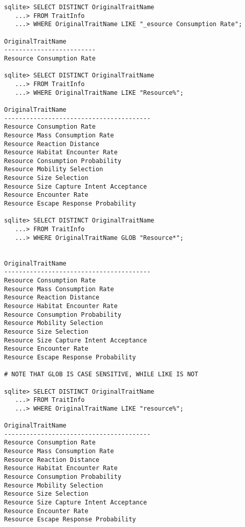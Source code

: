  \begin{lstlisting} 
sqlite> SELECT DISTINCT OriginalTraitName
   ...> FROM TraitInfo
   ...> WHERE OriginalTraitName LIKE "_esource Consumption Rate";

OriginalTraitName        
-------------------------
Resource Consumption Rate          

sqlite> SELECT DISTINCT OriginalTraitName
   ...> FROM TraitInfo
   ...> WHERE OriginalTraitName LIKE "Resource%";

OriginalTraitName                       
----------------------------------------
Resource Consumption Rate               
Resource Mass Consumption Rate          
Resource Reaction Distance              
Resource Habitat Encounter Rate         
Resource Consumption Probability        
Resource Mobility Selection             
Resource Size Selection                 
Resource Size Capture Intent Acceptance 
Resource Encounter Rate                 
Resource Escape Response Probability 

sqlite> SELECT DISTINCT OriginalTraitName
   ...> FROM TraitInfo
   ...> WHERE OriginalTraitName GLOB "Resource*";


OriginalTraitName                       
----------------------------------------
Resource Consumption Rate               
Resource Mass Consumption Rate          
Resource Reaction Distance              
Resource Habitat Encounter Rate         
Resource Consumption Probability        
Resource Mobility Selection             
Resource Size Selection                 
Resource Size Capture Intent Acceptance 
Resource Encounter Rate                 
Resource Escape Response Probability 

# NOTE THAT GLOB IS CASE SENSITIVE, WHILE LIKE IS NOT

sqlite> SELECT DISTINCT OriginalTraitName
   ...> FROM TraitInfo
   ...> WHERE OriginalTraitName LIKE "resource%";

OriginalTraitName                       
----------------------------------------
Resource Consumption Rate               
Resource Mass Consumption Rate          
Resource Reaction Distance              
Resource Habitat Encounter Rate         
Resource Consumption Probability        
Resource Mobility Selection             
Resource Size Selection                 
Resource Size Capture Intent Acceptance 
Resource Encounter Rate                 
Resource Escape Response Probability 

\end{lstlisting}

